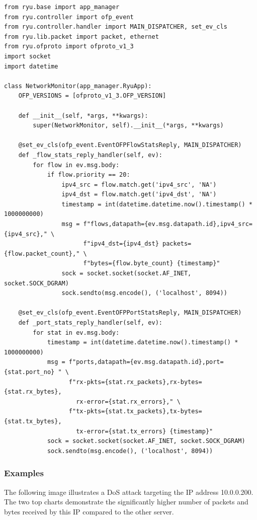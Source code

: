 \documentclass[a4paper,12pt]{article}
\begin{document}
\begin{verbatim}
from ryu.base import app_manager
from ryu.controller import ofp_event
from ryu.controller.handler import MAIN_DISPATCHER, set_ev_cls
from ryu.lib.packet import packet, ethernet
from ryu.ofproto import ofproto_v1_3
import socket
import datetime

class NetworkMonitor(app_manager.RyuApp):
    OFP_VERSIONS = [ofproto_v1_3.OFP_VERSION]

    def __init__(self, *args, **kwargs):
        super(NetworkMonitor, self).__init__(*args, **kwargs)

    @set_ev_cls(ofp_event.EventOFPFlowStatsReply, MAIN_DISPATCHER)
    def _flow_stats_reply_handler(self, ev):
        for flow in ev.msg.body:
            if flow.priority == 20:
                ipv4_src = flow.match.get('ipv4_src', 'NA')
                ipv4_dst = flow.match.get('ipv4_dst', 'NA')
                timestamp = int(datetime.datetime.now().timestamp() * 1000000000)
                msg = f"flows,datapath={ev.msg.datapath.id},ipv4_src={ipv4_src}," \
                      f"ipv4_dst={ipv4_dst} packets={flow.packet_count}," \
                      f"bytes={flow.byte_count} {timestamp}"
                sock = socket.socket(socket.AF_INET, socket.SOCK_DGRAM)
                sock.sendto(msg.encode(), ('localhost', 8094))

    @set_ev_cls(ofp_event.EventOFPPortStatsReply, MAIN_DISPATCHER)
    def _port_stats_reply_handler(self, ev):
        for stat in ev.msg.body:
            timestamp = int(datetime.datetime.now().timestamp() * 1000000000)
            msg = f"ports,datapath={ev.msg.datapath.id},port={stat.port_no} " \
                  f"rx-pkts={stat.rx_packets},rx-bytes={stat.rx_bytes},
                    rx-error={stat.rx_errors}," \
                  f"tx-pkts={stat.tx_packets},tx-bytes={stat.tx_bytes},
                    tx-error={stat.tx_errors} {timestamp}"
            sock = socket.socket(socket.AF_INET, socket.SOCK_DGRAM)
            sock.sendto(msg.encode(), ('localhost', 8094))
\end{verbatim}

\subsubsection{Examples}

The following image illustrates a DoS attack targeting the IP address 10.0.0.200. The two top charts demonstrate the significantly higher number of packets and bytes received by this IP compared to the other server.
\end{document}
